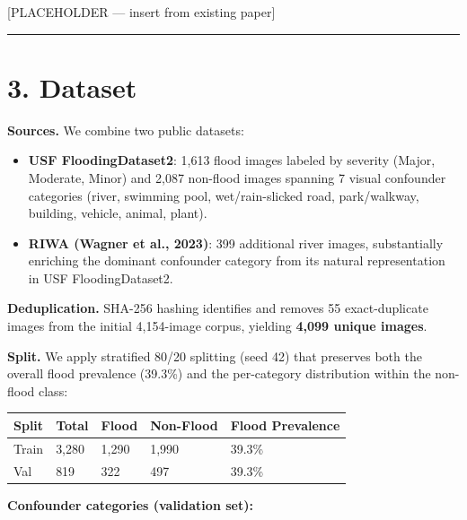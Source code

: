 \documentclass[
  11pt,
]{article}
\newcounter{none} %
\providecommand{\tightlist}{%
  \setlength{\itemsep}{0pt}\setlength{\parskip}{0pt}}
\begin{document}
{[}PLACEHOLDER --- insert from existing paper{]}

\begin{center}\rule{0.5\linewidth}{0.5pt}\end{center}

\section{3. Dataset}\label{dataset}

\textbf{Sources.} We combine two public datasets:

\begin{itemize}
\tightlist
\item
  \textbf{USF FloodingDataset2}: 1,613 flood images labeled by severity
  (Major, Moderate, Minor) and 2,087 non-flood images spanning 7 visual
  confounder categories (river, swimming pool, wet/rain-slicked road,
  park/walkway, building, vehicle, animal, plant).
\item
  \textbf{RIWA (Wagner et al., 2023)}: 399 additional river images,
  substantially enriching the dominant confounder category from its
  natural representation in USF FloodingDataset2.
\end{itemize}

\textbf{Deduplication.} SHA-256 hashing identifies and removes 55
exact-duplicate images from the initial 4,154-image corpus, yielding
\textbf{4,099 unique images}.

\textbf{Split.} We apply stratified 80/20 splitting (seed 42) that
preserves both the overall flood prevalence (39.3\%) and the
per-category distribution within the non-flood class:

{\def\LTcaptype{none} %
\begin{longtable}[]{@{}lllll@{}}
\toprule\noalign{}
Split & Total & Flood & Non-Flood & Flood Prevalence \\
\midrule\noalign{}
\endhead
\bottomrule\noalign{}
\endlastfoot
Train & 3,280 & 1,290 & 1,990 & 39.3\% \\
Val & 819 & 322 & 497 & 39.3\% \\
\end{longtable}
}

\textbf{Confounder categories (validation set):}
\end{document}
